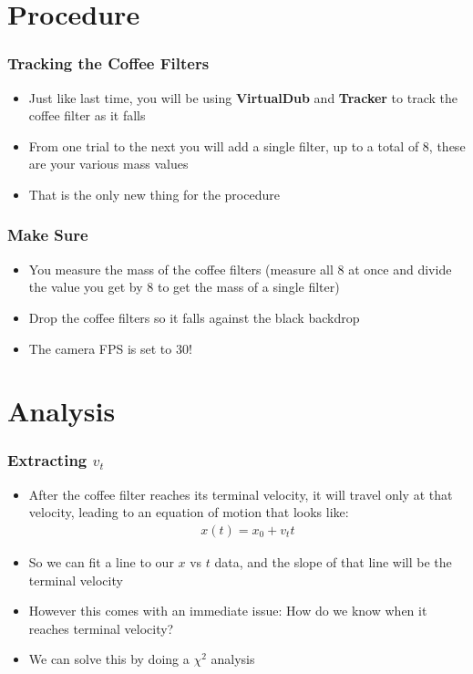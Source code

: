 \documentclass[aspectratio=169]{beamer}
\begin{document}
\section{Procedure}
\begin{frame}
  \frametitle{Tracking the Coffee Filters}
  \begin{itemize}
  \item Just like last time, you will be using \textbf{VirtualDub} and \textbf{Tracker} to track the coffee filter as it falls
  \item From one trial to the next you will add a single filter, up to a total of 8, these are your various mass values
  \item That is the only new thing for the procedure
  \end{itemize}
\end{frame}
\begin{frame}
  \frametitle{Make Sure}
  \begin{itemize}
  \item You measure the mass of the coffee filters (measure all 8 at once and divide the value you get by 8 to get the mass of a single filter)
  \item Drop the coffee filters so it falls against the black backdrop
  \item The camera FPS is set to 30!
  \end{itemize}
\end{frame}

\section{Analysis}
\begin{frame}
  \frametitle{Extracting $v_t$}
  \begin{itemize}
  \item After the coffee filter reaches its terminal velocity, it will travel only at that velocity, leading to an equation of motion that looks like:
    \begin{align*}
      x(t)=x_0+v_tt
    \end{align*}
  \item So we can fit a line to our $x$ vs $t$ data, and the slope of that line will be the terminal velocity
  \item However this comes with an immediate issue: How do we know when it reaches terminal velocity?
  \item We can solve this by doing a $\chi^2$ analysis
  \end{itemize}
\end{frame}
\end{document}

